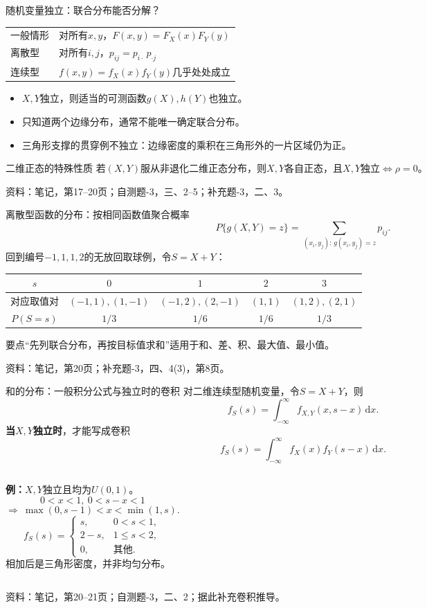 \documentclass[aspectratio=169,10pt]{beamer}
\newcommand{\dd}{\,\mathrm{d}}
\newcommand{\source}[1]{\vfill{\color{Muted}\fontsize{6.5}{8}\selectfont 资料：#1\par}}
\newcommand{\key}[1]{\begin{block}{要点}#1\end{block}}
\begin{document}
\begin{frame}[t]{随机变量独立：联合分布能否分解？}
\renewcommand{\arraystretch}{1.5}
\begin{tabular}{p{2.2cm}p{10.6cm}}
\toprule
一般情形 & 对所有$x,y$，$F(x,y)=F_X(x)F_Y(y)$\\
离散型 & 对所有$i,j$，$p_{ij}=p_{i\cdot}\,p_{\cdot j}$\\
连续型 & $f(x,y)=f_X(x)f_Y(y)$几乎处处成立\\\bottomrule
\end{tabular}
\vspace{2mm}
\begin{itemize}
\item $X,Y$独立，则适当的可测函数$g(X),h(Y)$也独立。
\item 只知道两个边缘分布，通常不能唯一确定联合分布。
\item 三角形支撑的贯穿例不独立：边缘密度的乘积在三角形外的一片区域仍为正。
\end{itemize}
\begin{block}{二维正态的特殊性质}
若$(X,Y)$服从非退化二维正态分布，则$X,Y$各自正态，且$X,Y$独立$\iff\rho=0$。
\end{block}
\source{笔记，第17--20页；自测题-3，三、2--5；补充题-3，二、3。}
\end{frame}

\begin{frame}[t]{离散型函数的分布：按相同函数值聚合概率}
\[
\boxed{P\{g(X,Y)=z\}=\sum_{(x_i,y_j):\,g(x_i,y_j)=z}p_{ij}}.
\]
回到编号$-1,1,1,2$的无放回取球例，令$S=X+Y$：
\renewcommand{\arraystretch}{1.5}
\begin{center}
\begin{tabular}{c|cccc}
\toprule
$s$ & $0$ & $1$ & $2$ & $3$\\\midrule
对应取值对 & $(-1,1),(1,-1)$ & $(-1,2),(2,-1)$ & $(1,1)$ & $(1,2),(2,1)$\\
$P(S=s)$ & $1/3$ & $1/6$ & $1/6$ & $1/3$\\\bottomrule
\end{tabular}
\end{center}
\key{“先列联合分布，再按目标值求和”适用于和、差、积、最大值、最小值。}
\source{笔记，第20页；补充题-3，四、4(3)，第8页。}
\end{frame}

\begin{frame}[t]{和的分布：一般积分公式与独立时的卷积}
对二维连续型随机变量，令$S=X+Y$，则
\[
f_S(s)=\int_{-\infty}^{\infty}f_{X,Y}(x,s-x)\dd x.
\]
\textbf{当$X,Y$独立时}，才能写成卷积
\[
\boxed{f_S(s)=\int_{-\infty}^{\infty}f_X(x)f_Y(s-x)\dd x}.
\]
\begin{columns}[T]
\textbf{例：}$X,Y$独立且均为$U(0,1)$。
\[
0<x<1,\ 0<s-x<1
\]
\[
\Longrightarrow\ \max(0,s-1)<x<\min(1,s).
\]
\[
f_S(s)=\begin{cases}s,&0<s<1,\\2-s,&1\le s<2,\\0,&\text{其他}.\end{cases}
\]
相加后是三角形密度，并非均匀分布。
\end{columns}
\source{笔记，第20--21页；自测题-3，二、2；据此补充卷积推导。}
\end{frame}
\end{document}
